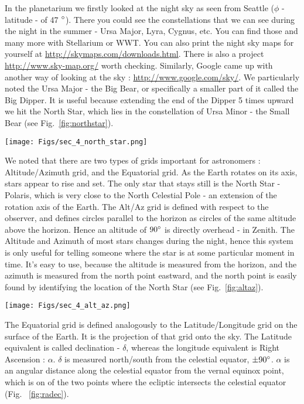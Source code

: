 \documentclass[paper=a4, fontsize=11pt]{scrartcl} %
\numberwithin{equation}{section} %
\begin{document}
In the planetarium we firstly  looked at the night sky as seen from Seattle ($\phi$ - latitude - of 47 $\degree$). There you could see the constellations that we can see during the night in the summer - Ursa Major, Lyra, Cygnus, etc. You can find those and many more  with Stellarium or WWT. You can also print the night sky maps for yourself at \url{http://skymaps.com/downloads.html}.  There is also a project \url{http://www.sky-map.org/} worth checking. Similarly, Google came up with another way of looking at the sky : \url{http://www.google.com/sky/}. We particularly noted the Ursa Major - the Big Bear, or specifically a smaller part of it called the Big Dipper. It is useful because extending the end of the Dipper 5 times upward we hit the North Star, which lies in the constellation of Ursa Minor - the Small Bear (see Fig.~\ref{fig:northstar}). 


\begin{figure*}
\centering
	\texttt{[image: Figs/sec\_4\_north\_star.png]}
	\caption[north]{How to find the North Star.}
	\label{fig:northstar}
\end{figure*}  

We noted that there are two types of grids important for astronomers : Altitude/Azimuth grid, and the Equatorial grid. As the Earth rotates on its axis, stars appear to rise and set. The only star that stays still is the North Star - Polaris, which is very close to the North Celestial Pole - an extension of the rotation axis of the Earth.  The Alt/Az grid is defined with respect to the observer, and defines circles parallel to the horizon as circles of the same altitude above the horizon. Hence an altitude of $90 \degree$ is directly overhead - in Zenith. The Altitude and Azimuth of most stars changes during the night, hence this system is only useful for  telling someone where the star is at some particular moment in time. It's easy to use, because the altitude is measured from the horizon, and the azimuth 
is measured from the north point eastward, and the north point is easily found by identifying the location of the North Star (see Fig.~\ref{fig:altaz}).

\begin{figure*}
\centering
	\texttt{[image: Figs/sec\_4\_alt\_az.png]}
	\caption[AltAz]{The horizontal - Alt/Az coordinates.}
	\label{fig:altaz}
\end{figure*}  

The Equatorial grid is defined analogously to the Latitude/Longitude grid on the surface of the Earth. It is the projection of that grid onto the sky. The Latitude equivalent is called declination - $\delta$, whereas the longitude equivalent is Right Ascension : $\alpha$.   $\delta$ is measured  north/south from the celestial equator, $\pm 90 \degree$.  $\alpha$ is an angular distance along the celestial equator from the vernal equinox point, which is on of the  two  points where the ecliptic intersects the celestial equator (Fig. ~\ref{fig:radec}). 
\end{document}
